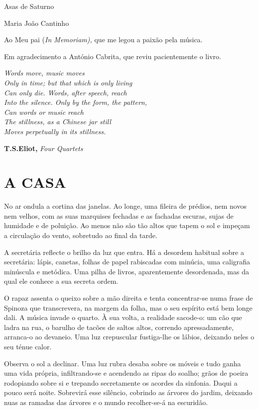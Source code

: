 Asas de Saturno

Maria João Cantinho

Ao Meu pai (\emph{In Memoriam), }que me legou a paixão pela música.

Em agradecimento a António Cabrita, que reviu pacientemente o livro.

\emph{Words move, music moves\\
Only in time; but that which is only living\\
Can only die. Words, after speech, reach\\
Into the silence. Only by the form, the pattern,\\
Can words or music reach\\
The stillness, as a Chinese jar still\\
Moves perpetually in its stillness.}

\textbf{T.S.Eliot, }\emph{Four Quartets}

\section{\textbf{A CASA}}

No ar ondula a cortina das janelas. Ao longe, uma fileira de prédios,
nem novos nem velhos, com as suas marquises fechadas e as fachadas
escuras, sujas de humidade e de poluição. Ao menos não são tão altos que
tapem o sol e impeçam a circulação do vento, sobretudo ao final da
tarde.

A secretária reflecte o brilho da luz que entra. Há a desordem habitual
sobre a secretária: lápis, canetas, folhas de papel rabiscadas com
minúcia, uma caligrafia minúscula e metódica. Uma pilha de livros,
aparentemente desordenada, mas da qual ele conhece a sua secreta ordem.

O rapaz assenta o queixo sobre a mão direita e tenta concentrar-se numa
frase de Spinoza que transcrevera, na margem da folha, mas o seu
espírito está bem longe dali. A música invade o quarto. À sua volta, a
realidade sacode-o: um cão que ladra na rua, o barulho de tacões de
saltos altos, correndo apressadamente, arranca-o ao devaneio. Uma luz
crepuscular fustiga-lhe os lábios, deixando neles o seu ténue calor.

Observa o sol a declinar. Uma luz rubra desaba sobre os móveis e tudo
ganha uma vida própria, infiltrando-se e acendendo as ripas do soalho;
grãos de poeira rodopiando sobre si e trepando secretamente os acordes
da sinfonia. Daqui a pouco será noite. Sobrevirá esse silêncio, cobrindo
as árvores do jardim, deixando nuas as ramadas das árvores e o mundo
recolher-se-á na escuridão.

